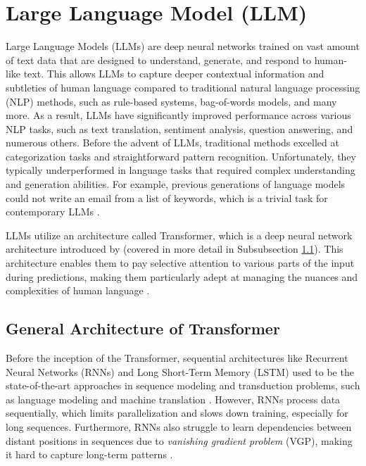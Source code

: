 \section{Large Language Model (LLM)}
Large Language Models (LLMs) are deep neural networks trained on vast amount of text data that are designed to understand, generate, and respond to human-like text. This allows LLMs to capture deeper contextual information and subtleties of human language compared to traditional natural language processing (NLP) methods, such as rule-based systems, bag-of-words models, and many more. As a result, LLMs have significantly improved performance across various NLP tasks, such as text translation, sentiment analysis, question answering, and numerous others. Before the advent of LLMs, traditional methods excelled at categorization tasks and straightforward pattern recognition. Unfortunately, they typically underperformed in language tasks that required complex understanding and generation abilities. For example, previous generations of language models could not write an email from a list of keywords, which is a trivial task for contemporary LLMs \citep{raschka2024build}.

LLMs utilize an architecture called Transformer, which is a deep neural network architecture introduced by \cite{vaswani2023attentionneed} (covered in more detail in Subsubsection \ref{chap2:transformer}). This architecture enables them to pay selective attention to various parts of the input during predictions, making them particularly adept at managing the nuances and complexities of human language \citep{raschka2024build}.

\subsection{General Architecture of Transformer}
\label{chap2:transformer}
Before the inception of the Transformer, sequential architectures like Recurrent Neural Networks (RNNs) and Long Short-Term Memory (LSTM) \citep{hochreiter1997lstm} used to be the state-of-the-art approaches in sequence modeling and transduction problems, such as language modeling and machine translation \citep{sutskever2014sequencesequencelearningneural, bahdanau2016neuralmachinetranslationjointly, cho2014learningphraserepresentationsusing}. However, RNNs process data sequentially, which limits parallelization and slows down training, especially for long sequences. Furthermore, RNNs also struggle to learn dependencies between distant positions in sequences due to \textit{vanishing gradient problem} (VGP), making it hard to capture long-term patterns \citep{hochreiter2001gradient}.

